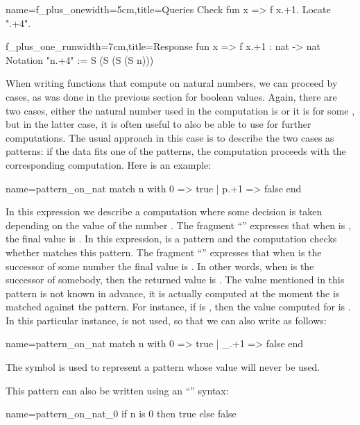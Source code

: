 \begin{coq}{name=f_plus_one}{width=5cm,title=Queries}
Check fun x => f x.+1.
Locate ".+4".
\end{coq}
\begin{coqout}{f_plus_one_run}{width=7cm,title=Response}
fun x => f x.+1 : nat -> nat
Notation "n.+4" := S (S (S (S n)))
\end{coqout}

When writing functions that compute on natural numbers, we can
proceed by cases, as was done in the previous section for boolean
values.  Again, there are two cases, either the natural number used in
the computation is  or it is  for
some , but in the latter case, it is often useful to also be able
to use  for further computations.  The usual approach in this
case is to describe the two cases as patterns: if the data fits one of
the patterns, the computation proceeds with the corresponding
computation.  Here is an example:

\begin{coq}{name=pattern_on_nat}{}
match n with 0 => true | p.+1 => false end
\end{coq}
In this expression we describe a computation where some decision is
taken depending on the value of the number .  The fragment 
``'' expresses that when  is , the final value is
.  In this expression,  is a pattern and the computation
checks whether  matches this pattern.  The fragment
``''  expresses that when  is the successor of
some number  the final value is .  In other words, when
 is the successor of somebody, then the returned value is
.  The value  mentioned in this pattern is not known in
advance, it is actually computed at the moment the  is matched
against the pattern.  For instance, if  is , then the value
computed for  is .  In this particular instance,  is
not used, so that we can also write as follows:

\begin{coq}{name=pattern_on_nat}{}
match n with 0 => true | _.+1 => false end
\end{coq}
The symbol \C{_} is used to represent a pattern whose value will never be
used.

This pattern can also be written using an ``''
syntax:

\begin{coq}{name=pattern_on_nat_0}{}
if n is 0 then true else false
\end{coq}

